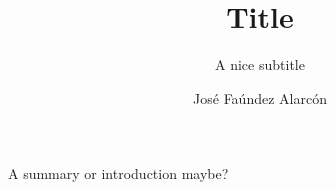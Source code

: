 \documentclass{kthreport}
\title{Title}
\subtitle{A nice subtitle}
\author{Jos\'e Fa\'undez Alarc\'on}
\begin{document}
\maketitle
A summary or introduction maybe?





\end{document}
